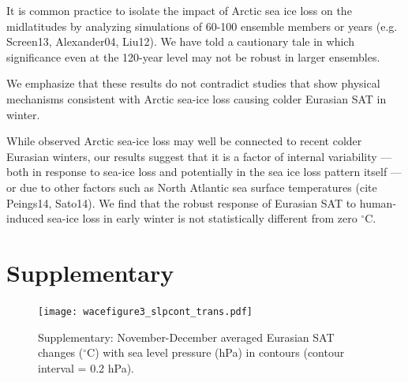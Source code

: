 \documentclass[grl]{AGUTeX}  %
\begin{document}
\begin{article}
It is common practice to isolate the impact of Arctic sea ice loss on the midlatitudes by analyzing simulations of 60-100 ensemble members or years (e.g. Screen13, Alexander04, Liu12). We have told a cautionary tale in which significance even at the 120-year level may not be robust in larger ensembles.

We emphasize that these results do not contradict studies that show physical mechanisms consistent with Arctic sea-ice loss causing colder Eurasian SAT in winter. 

While observed Arctic sea-ice loss may well be connected to recent colder Eurasian winters, our results suggest that it is a factor of internal variability --- both in response to sea-ice loss and potentially in the sea ice loss pattern itself --- or due to other factors such as North Atlantic sea surface temperatures (cite Peings14, Sato14). We find that the robust response of Eurasian SAT to human-induced sea-ice loss in early winter is not statistically different from zero $^\circ$C.


\section{Supplementary}

\begin{figure}[t]
  \noindent\texttt{[image: wacefigure3\_slpcont\_trans.pdf]} \\ 
  \caption{Supplementary: November-December averaged Eurasian SAT changes ($^\circ$C) with sea level pressure (hPa) in contours (contour interval = 0.2 hPa).
}\label{fig:figsup1}
\end{figure} %




\end{article}
\end{document}
